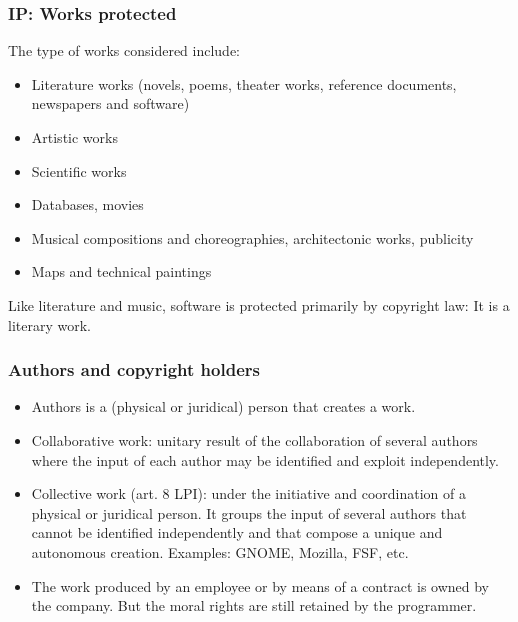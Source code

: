\begin{frame}
\frametitle{IP: Works protected}

The type of works considered include:

\begin{itemize}
\item Literature works (novels, poems, theater works, reference documents, newspapers and software)
\item Artistic works 
\item Scientific works 
\item Databases, movies 
\item Musical compositions and choreographies, architectonic works, publicity 
\item Maps and technical paintings
\end{itemize}

Like literature and music, \alert{software} is protected primarily by copyright law: It is a \alert{literary work}.
\end{frame}




\begin{frame}
\frametitle{Authors and copyright holders}

\begin{itemize}

\item Authors is a (physical or juridical) person that creates
a work. 

\item \alert{Collaborative work}: unitary result of the collaboration
of several authors where the input of each author may be
identified and exploit independently.

\item \alert{Collective work} (art. 8 LPI): under the initiative and coordination of
a physical or juridical person. It groups the input
of several authors that cannot be identified independently
and that compose a unique and autonomous creation. Examples: GNOME,
Mozilla, FSF, etc.

\item The work produced by an employee or by means of 
a contract is owned by the company.
But the moral rights are still retained by the programmer.

\end{itemize}

\end{frame}

